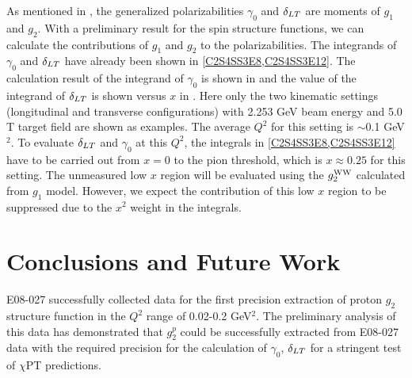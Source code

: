 
As mentioned in , the generalized polarizabilities $\gamma_0$ and $\delta_{LT}$ are moments of $g_1$ and $g_2$. With a preliminary result for the spin structure functions, we can calculate the contributions of $g_1$ and $g_2$ to the polarizabilities. The integrands of $\gamma_0$ and $\delta_{LT}$ have already been shown in \cref{C2S4SS3E8,C2S4SS3E12}. The calculation result of the integrand of $\gamma_0$ is shown in  and the value of the integrand of $\delta_{LT}$ is shown versus $x$ in . Here only the two kinematic settings (longitudinal and transverse configurations) with 2.253 GeV beam energy and 5.0 T target field are shown as examples. The average $Q^2$ for this setting is $\sim$0.1 GeV${}^2$. To evaluate $\delta_{LT}$ and $\gamma_0$ at this $Q^2$, the integrals in \cref{C2S4SS3E8,C2S4SS3E12} have to be carried out from $x=0$ to the pion threshold, which is $x\approx0.25$ for this setting. The unmeasured low $x$ region will be evaluated using the $g_2^{\mathrm{WW}}$ calculated from $g_1$ model. However, we expect the contribution of this low $x$ region to be suppressed due to the $x^2$ weight in the integrals.


\section{Conclusions and Future Work}
\label{C8S6}

E08-027 successfully collected data for the first precision extraction of proton $g_2$ structure function in the $Q^2$ range of 0.02-0.2 GeV${}^2$. The preliminary analysis of this data has demonstrated that $g_2^p$ could be successfully extracted from E08-027 data with the required precision for the calculation of $\gamma_0$, $\delta_{LT}$ for a stringent test of $\chi$PT predictions.

